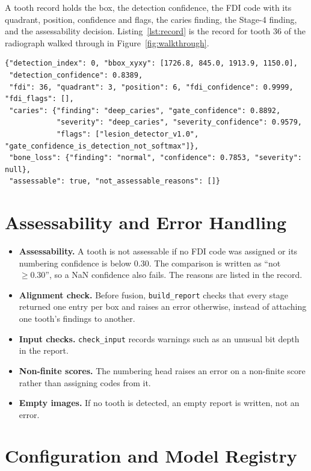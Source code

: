 A tooth record holds the box, the detection confidence, the FDI code with its quadrant, position,
confidence and flags, the caries finding, the Stage-4 finding, and the assessability decision.
Listing~\ref{lst:record} is the record for tooth 36 of the radiograph walked through in
Figure~\ref{fig:walkthrough}.

\begin{lstlisting}[caption={Report record for tooth 36 of DENTEX \texttt{test\_0} (abridged from the saved report).},label=lst:record,language={}]
{"detection_index": 0, "bbox_xyxy": [1726.8, 845.0, 1913.9, 1150.0],
 "detection_confidence": 0.8389,
 "fdi": 36, "quadrant": 3, "position": 6, "fdi_confidence": 0.9999, "fdi_flags": [],
 "caries": {"finding": "deep_caries", "gate_confidence": 0.8892,
            "severity": "deep_caries", "severity_confidence": 0.9579,
            "flags": ["lesion_detector_v1.0", "gate_confidence_is_detection_not_softmax"]},
 "bone_loss": {"finding": "normal", "confidence": 0.7853, "severity": null},
 "assessable": true, "not_assessable_reasons": []}
\end{lstlisting}

\section{Assessability and Error Handling}

\begin{itemize}
\item \textbf{Assessability.} A tooth is not assessable if no FDI code was assigned or its numbering
  confidence is below 0.30. The comparison is written as ``not $\ge 0.30$'', so a NaN confidence
  also fails. The reasons are listed in the record.
\item \textbf{Alignment check.} Before fusion, \texttt{build\_report} checks that every stage returned
  one entry per box and raises an error otherwise, instead of attaching one tooth's findings to
  another.
\item \textbf{Input checks.} \texttt{check\_input} records warnings such as an unusual bit depth in
  the report.
\item \textbf{Non-finite scores.} The numbering head raises an error on a non-finite score rather
  than assigning codes from it.
\item \textbf{Empty images.} If no tooth is detected, an empty report is written, not an error.
\end{itemize}

\section{Configuration and Model Registry}

